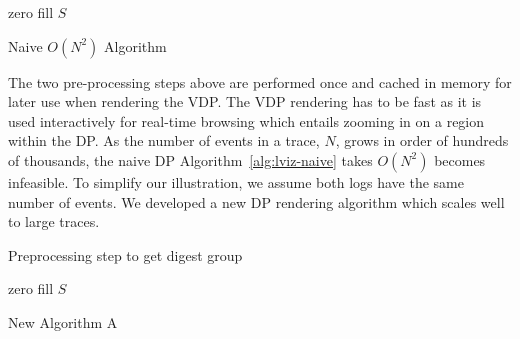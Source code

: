 \begin{algorithm}[htb]
\BlankLine
zero fill $S$\;
\caption{Naive $O(N^2)$ Algorithm}
\label{alg:lviz-naive}
\end{algorithm}

The two pre-processing steps above are performed once and
cached in memory for later use when rendering the VDP.
The VDP rendering has to be fast as it is
used interactively for real-time browsing 
which entails zooming in on a region within the DP.
As the number of events in a trace, $N$, grows in order of hundreds of thousands,
the naive DP Algorithm~\ref{alg:lviz-naive}
takes $O(N^2)$ becomes infeasible.
To simplify our illustration, we assume both logs have the same number
of events.
We developed a new DP rendering algorithm which scales well to large traces.

\begin{algorithm}[htb]
\BlankLine
{}
\caption{Preprocessing step to get digest group}
\label{alg:lviz-algpre}
\end{algorithm}

\begin{algorithm}[htb]
\BlankLine
zero fill $S$\;
\caption{New Algorithm A}
\label{alg:lviz-alg1}
\end{algorithm}

